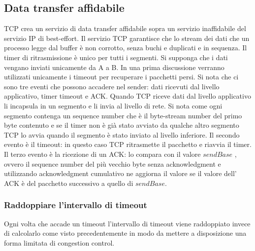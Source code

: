 \subsection{Data transfer affidabile}
TCP crea un servizio di data transfer affidabile sopra un servizio inaffidabile del servizio IP di best-effort. Il servizio TCP garantisce che lo stream dei
dati che un processo legge dal buffer \`e non corrotto, senza buchi e duplicati e in sequenza. Il timer di ritrasmissione \`e unico per tutti i segmenti. Si 
supponga che i dati vengano inviati unicamente da A a B. In una prima discussione verranno utilizzati unicamente i timeout per recuperare i pacchetti persi.
Si nota che ci sono tre eventi che possono accadere nel sender: dati ricevuti dal livello applicativo, timer timeout e ACK. Quando TCP riceve dati dal
livello applicativo li incapsula in un segmento e li invia al livello di rete. Si nota come ogni segmento contenga un sequence number che \`e il byte-stream
number del primo byte contenuto e se il timer non \`e gi\`a stato avviato da qualche altro segmento TCP lo avvia quando il segmento \`e stato inviato al
livello inferiore. Il secondo evento \`e il timeout: in questo caso TCP ritrasmette il pacchetto e riavvia il timer. Il terzo evento \`e la ricezione di un 
ACK: lo compara con il valore $sendBase$ , ovvero il sequence number del pi\`u vecchio byte senza acknowledgment e utilizzando acknowledgment cumulativo
ne aggiorna il valore se il valore dell' ACK \`e del pacchetto successivo a quello di $sendBase$. 
\subsubsection{Raddoppiare l'intervallo di timeout}
Ogni volta che accade un timeout l'intervallo di timeout viene raddoppiato invece di calcolarlo come visto precedentemente in modo da mettere a disposizione
una forma limitata di congestion control. 
